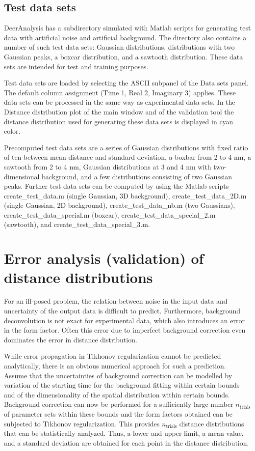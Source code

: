 \documentclass{article}
\begin{document}
\subsection{Test data sets}
DeerAnalysis has a subdirectory {\ttfamily simulated} with Matlab scripts for generating test data with artificial noise and artificial background. The directory also contains a number of such test data sets: Gaussian distributions, distributions with two Gaussian peaks, a boxcar distribution, and a sawtooth distribution. These data sets are intended for test and training purposes.

Test data sets are loaded by selecting the {\ttfamily ASCII} subpanel of the {\ttfamily Data sets} panel. The default column assignment (Time 1, Real 2, Imaginary 3) applies. These data sets can be processed in the same way as experimental data sets. In the {\ttfamily Distance distribution} plot of the main window and of the validation tool the distance distribution used for generating these data sets is displayed in cyan color.

Precomputed test data sets are a series of Gaussian distributions with fixed ratio of ten between mean distance and standard deviation, a boxbar from 2 to 4 nm, a sawtooth from 2 to 4 nm, Gaussian distributions at 3 and 4 nm with two-dimensional background, and a few distributions consisting of two Gaussian peaks. Further test data sets can be computed by using the Matlab scripts {\ttfamily create\_test\_data.m} (single Gaussian, 3D background), {\ttfamily create\_test\_data\_2D.m} (single Gaussian, 2D background), {\ttfamily create\_test\_data\_nb.m} (two Gaussians), {\ttfamily create\_test\_data\_special.m} (boxcar), {\ttfamily create\_test\_data\_special\_2.m} (sawtooth), and {\ttfamily create\_test\_data\_special\_3.m}.

\section{Error analysis (validation) of distance distributions}
\label{validation}
For an ill-posed problem, the relation between noise in the input data and uncertainty of the output data is difficult to predict. Furthermore, background deconvolution is not exact for experimental data, which also introduces an error in the form factor. Often this error due to imperfect background correction even dominates the error in distance distribution.

While error propagation in Tikhonov regularization cannot be predicted analytically, there is an obvious numerical approach for such a prediction. Assume that the uncertainties of background correction can be modelled by variation of the starting time for the background fitting within certain bounds and of the dimensionality of the spatial distribution within certain bounds. Background correction can now be performed for a sufficiently large number $n_\mathrm{trials}$ of parameter sets within these bounds and the form factors obtained can be subjected to Tikhonov regularization. This provides $n_\mathrm{trials}$ distance distributions that can be statistically analyzed. Thus, a lower and upper limit, a mean value, and a standard deviation are obtained for each point in the distance distribution.
\end{document}

